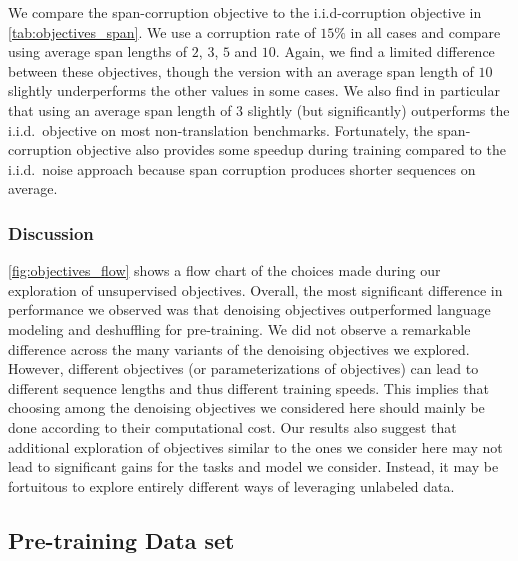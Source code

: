 We compare the span-corruption objective to the i.i.d-corruption objective in \ref{tab:objectives_span}.
We use a corruption rate of $15\%$ in all cases and compare using average span lengths of $2$, $3$, $5$ and $10$. Again, we find a limited difference between these objectives, though the version with an average span length of $10$ slightly underperforms the other values in some cases. We also find in particular that using an average span length of $3$ slightly (but significantly) outperforms the i.i.d.\ objective on most non-translation benchmarks. Fortunately, the span-corruption objective also provides some speedup during training compared to the i.i.d.\ noise approach because span corruption produces shorter sequences on average.

\subsubsection{Discussion}

\ref{fig:objectives_flow} shows a flow chart of the choices made during our exploration of unsupervised objectives. Overall, the most significant difference in performance we observed was that denoising objectives outperformed language modeling and deshuffling for pre-training. We did not observe a remarkable difference across the many variants of the denoising objectives we explored. However, different objectives (or parameterizations of objectives) can lead to different sequence lengths and thus different training speeds. This implies that choosing among the denoising objectives we considered here should mainly be done according to their computational cost. Our results also suggest that additional exploration of objectives similar to the ones we consider here may not lead to significant gains for the tasks and model we consider. Instead, it may be fortuitous to explore entirely different ways of leveraging unlabeled data.

\subsection{Pre-training Data set}
\label{sec:datasets}

